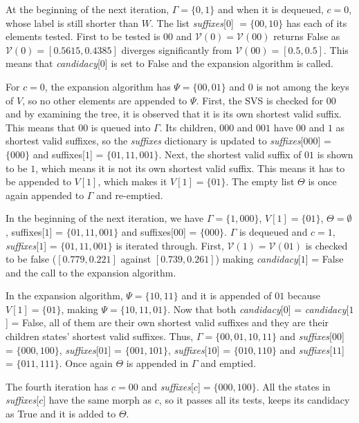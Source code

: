 {At the beginning of the next iteration, $\Gamma = \{0, 1\}$ and when it is dequeued, $c = 0$, whose label is still shorter than $W$. The list \textit{suffixes}[$0$] $= \{00, 10\}$ has each of its elements tested. First to be tested is $00$ and $\mathcal{V}(0) = \mathcal{V}(00)$ returns False as $\mathcal{V}(0) = [0.5615, 0.4385]$ diverges significantly from $\mathcal{V}(00) = [0.5, 0.5]$. This means that \textit{candidacy}[$0$] is set to False and the expansion algorithm is called.

For $c = 0$, the expansion algorithm has $\Psi = \{00, 01\}$ and $0$ is not among the keys of $V$, so no other elements are appended to $\Psi$. First, the SVS is checked for $00$ and by examining the tree, it is observed that it is its own shortest valid suffix. This means that $00$ is queued into $\Gamma$. Its children, $000$ and $001$ have $00$ and $1$ as shortest valid suffixes, so the \textit{suffixes} dictionary is updated to \textit{suffixes}[$000$] = $\{000\}$ and suffixes[$1$] = $\{01, 11, 001\}$. Next, the shortest valid suffix of $01$ is shown to be $1$, which means it is not its own shortest valid suffix. This means it has to be appended to $V[1]$, which makes it $V[1] = \{01\}$. The empty list $\Theta$ is once again appended to $\Gamma$ and re-emptied. 

In the beginning of the next iteration, we have $\Gamma = \{1, 000\}$, $V[1] = \{01\}$, $\Theta = \emptyset$, suffixes[$1$] = $\{01, 11, 001\}$ and suffixes[$00$] = $\{000\}$. $\Gamma$ is dequeued and $c = 1$, \textit{suffixes}[$1$] = $\{01, 11, 001\}$ is iterated through. First, $\mathcal{V}(1) = \mathcal{V}(01)$ is checked to be false ($[0.779, 0.221]$ against $[0.739, 0.261]$) making \textit{candidacy}[$1$] = False and the call to the expansion algorithm.

In the expansion algorithm, $\Psi = \{10, 11\}$ and it is appended of $01$ because $V[1] = \{01\}$, making $\Psi = \{10, 11, 01\}$. Now that both \textit{candidacy}[$0$] = \textit{candidacy}[$1$] = False, all of them are their own shortest valid suffixes and they are their children states' shortest valid suffixes. Thus, $\Gamma = \{00, 01, 10, 11\}$ and \textit{suffixes}[$00$] = $\{000, 100\}$, \textit{suffixes}[$01$] = $\{001, 101\}$, \textit{suffixes}[$10$] = $\{010, 110\}$ and \textit{suffixes}[$11$] = $\{011, 111\}$. Once again $\Theta$ is appended in $\Gamma$ and emptied.

The fourth iteration has $c = 00$ and \textit{suffixes}[$c$]$ = \{000, 100\}$. All the states in \textit{suffixes}[$c$] have the same morph as $c$, so it passes all its tests, keeps its candidacy as True and it is added to $\Theta$.

}
